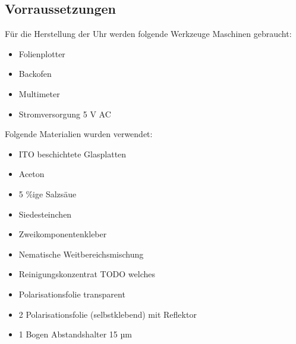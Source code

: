 \subsection{Vorraussetzungen}
Für die Herstellung der Uhr werden folgende Werkzeuge Maschinen gebraucht:
\begin{itemize}
\item Folienplotter
\item Backofen
\item Multimeter
\item Stromversorgung 5 V AC

\end{itemize}
Folgende Materialien wurden verwendet:
\begin{itemize}
\item ITO beschichtete Glasplatten
\item Aceton
\item 5 \%ige Salzsäue
\item Siedesteinchen
\item Zweikomponentenkleber
\item Nematische Weitbereichsmischung
\item Reinigungskonzentrat TODO welches
\item Polarisationsfolie transparent
\item 2 Polarisationsfolie (selbstklebend) mit Reflektor
\item 1 Bogen Abstandshalter 15 µm
\end{itemize}